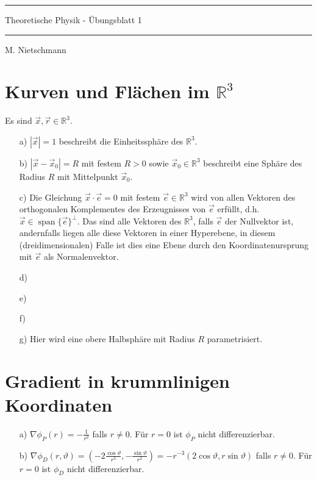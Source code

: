 \documentclass[11pt]{article}
\theoremstyle{plain}
\theoremstyle{definition}
\theoremstyle{remark}
\newcommand{\R}{\mathbb{R}}
\newcommand{\D}{\displaystyle}
\begin{document}
\pagestyle{fancy}
\thispagestyle{plain}

\rule{\textwidth}{.5pt}
\begin{center}
\Huge{Theoretische Physik - Übungsblatt 1}
\end{center}

\rule{\textwidth}{.5pt}
\text{} \hfill M. Nietschmann 




\section{Kurven und Flächen im $ \R^3 $} 

Es sind $ \vec{x},\vec{r} \in \R^3 $. 
\begin{itemize}
\item[a)] 
$ | \vec{x} | = 1 $ beschreibt die Einheitssphäre des $ \R^3 $. 
\item[b)] 
$ | \vec{x} - \vec{x}_0 | = R $ mit festem $ R > 0 $ sowie $ \vec{x}_0 \in \R^3 $ beschreibt eine Sphäre des Radius $ R $ mit Mittelpunkt $ \vec{x}_0 $. 
\item[c)] 
Die Gleichung $ \vec{x} \cdot \vec{e} = 0 $ mit festem $ \vec{e} \in \R^3 $ 
wird von allen Vektoren des orthogonalen Komplementes des Erzeugnisses von $ \vec{e} $ erfüllt, d.h. $ \vec{x} \in \operatorname{span} \{ \vec{e} \}^\perp $. 
Das sind alle Vektoren des $ \R^3 $, falls $ \vec{e} $ der Nullvektor ist, andernfalls liegen alle diese Vektoren in einer Hyperebene, in diesem (dreidimensionalen) Falle ist dies eine Ebene durch den Koordinatenursprung mit $ \vec{e} $ als Normalenvektor. 
\item[d)] 

\item[e)] 

\item[f)] 

\item[g)] 
Hier wird eine obere Halbsphäre mit Radius $ R $ parametrisiert. 
\end{itemize}


\section{Gradient in krummlinigen Koordinaten}

\begin{itemize}
\item[a)] 
$ \D \nabla \phi_P (r) = -\frac{1}{r^2} $ falls $ r \neq 0 $. Für $ r=0 $ ist $ \phi_P $ nicht differenzierbar. 
\item[b)] 
$ \D \nabla \phi_D (r,\vartheta) = \left( -2 \frac{\cos \vartheta}{r^3} , - \frac{\sin \vartheta}{r^2} \right) = -r^{-3} (2\cos \vartheta,r\sin\vartheta) $ falls $ r \neq 0 $. Für $ r=0 $ ist $ \phi_D $ nicht differenzierbar. 
\end{itemize}
\end{document}

